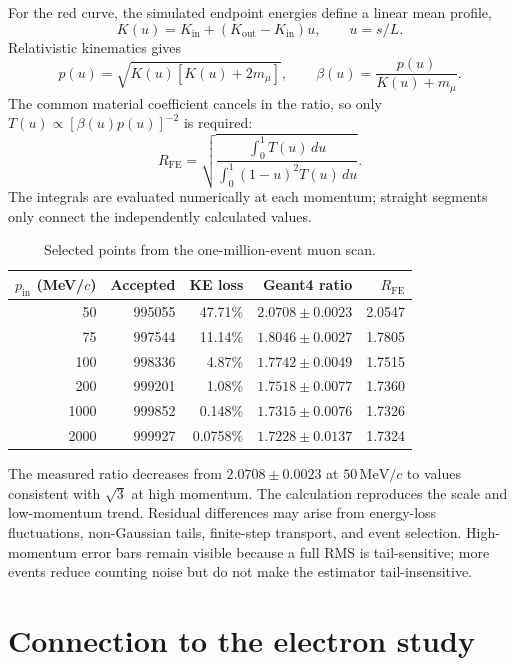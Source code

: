 \documentclass[10pt,letterpaper]{article}
\newcommand{\MeVc}{\,\mathrm{MeV}/c}
\begin{document}
For the red curve, the simulated endpoint energies define a linear mean profile,
\begin{equation}
K(u)=K_{\mathrm{in}}+(K_{\mathrm{out}}-K_{\mathrm{in}})u,\qquad u=s/L.
\end{equation}
Relativistic kinematics gives
\begin{equation}
p(u)=\sqrt{K(u)[K(u)+2m_\mu]},\qquad \beta(u)=\frac{p(u)}{K(u)+m_\mu}.
\end{equation}
The common material coefficient cancels in the ratio, so only
$T(u)\propto[\beta(u)p(u)]^{-2}$ is required:
\begin{equation}
R_{\mathrm{FE}}=\sqrt{\frac{\int_0^1T(u)\,du}{\int_0^1(1-u)^2T(u)\,du}}.
\label{eq:red}
\end{equation}
The integrals are evaluated numerically at each momentum; straight segments
only connect the independently calculated values.

\begin{table}[t]
\centering
\caption{Selected points from the one-million-event muon scan.}
\label{tab:scan}
\small
\begin{tabular}{rrrrr}
\toprule
$p_{\mathrm{in}}$ (MeV/$c$) & Accepted & KE loss & Geant4 ratio & $R_{\mathrm{FE}}$ \\
\midrule
50 & 995055 & 47.71\% & $2.0708\pm0.0023$ & 2.0547 \\
75 & 997544 & 11.14\% & $1.8046\pm0.0027$ & 1.7805 \\
100 & 998336 & 4.87\% & $1.7742\pm0.0049$ & 1.7515 \\
200 & 999201 & 1.08\% & $1.7518\pm0.0077$ & 1.7360 \\
1000 & 999852 & 0.148\% & $1.7315\pm0.0076$ & 1.7326 \\
2000 & 999927 & 0.0758\% & $1.7228\pm0.0137$ & 1.7324 \\
\bottomrule
\end{tabular}
\end{table}

The measured ratio decreases from $2.0708\pm0.0023$ at $50\MeVc$ to values
consistent with $\sqrt{3}$ at high momentum. The calculation reproduces the
scale and low-momentum trend. Residual differences may arise from energy-loss fluctuations,
non-Gaussian tails, finite-step transport, and event selection. High-momentum error bars remain
visible because a full RMS is tail-sensitive; more events reduce counting noise
but do not make the estimator tail-insensitive.

\section{Connection to the electron study}
\end{document}
